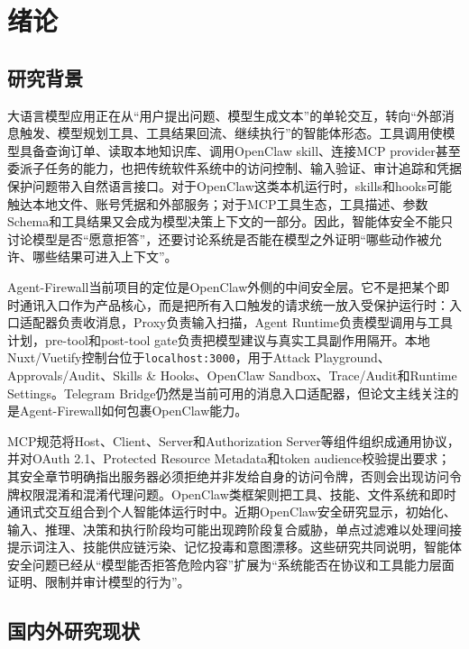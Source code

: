 \documentclass[UTF8,zihao=-4,scheme=chinese,fontset=none]{ctexart}
\newcommand{\code}[1]{{\ttfamily\small\nolinkurl{#1}}}
\begin{document}
\clearpage
{}
\setcounter{page}{1}

\section{绪论}

\subsection{研究背景}

大语言模型应用正在从“用户提出问题、模型生成文本”的单轮交互，转向“外部消息触发、模型规划工具、工具结果回流、继续执行”的智能体形态。工具调用使模型具备查询订单、读取本地知识库、调用OpenClaw skill、连接MCP provider甚至委派子任务的能力，也把传统软件系统中的访问控制、输入验证、审计追踪和凭据保护问题带入自然语言接口。对于OpenClaw这类本机运行时，skills和hooks可能触达本地文件、账号凭据和外部服务；对于MCP工具生态，工具描述、参数Schema和工具结果又会成为模型决策上下文的一部分。因此，智能体安全不能只讨论模型是否“愿意拒答”，还要讨论系统是否能在模型之外证明“哪些动作被允许、哪些结果可进入上下文”。

Agent-Firewall当前项目的定位是OpenClaw外侧的中间安全层。它不是把某个即时通讯入口作为产品核心，而是把所有入口触发的请求统一放入受保护运行时：入口适配器负责收消息，Proxy负责输入扫描，Agent Runtime负责模型调用与工具计划，pre-tool和post-tool gate负责把模型建议与真实工具副作用隔开。本地Nuxt/Vuetify控制台位于\code{localhost:3000}，用于Attack Playground、Approvals/Audit、Skills \& Hooks、OpenClaw Sandbox、Trace/Audit和Runtime Settings。Telegram Bridge仍然是当前可用的消息入口适配器，但论文主线关注的是Agent-Firewall如何包裹OpenClaw能力。

MCP规范将Host、Client、Server和Authorization Server等组件组织成通用协议，并对OAuth 2.1、Protected Resource Metadata和token audience校验提出要求；其安全章节明确指出服务器必须拒绝并非发给自身的访问令牌，否则会出现访问令牌权限混淆和混淆代理问题\cite{mcp_auth}。OpenClaw类框架则把工具、技能、文件系统和即时通讯式交互组合到个人智能体运行时中。近期OpenClaw安全研究显示，初始化、输入、推理、决策和执行阶段均可能出现跨阶段复合威胁，单点过滤难以处理间接提示词注入、技能供应链污染、记忆投毒和意图漂移\cite{deng2026taming}。这些研究共同说明，智能体安全问题已经从“模型能否拒答危险内容”扩展为“系统能否在协议和工具能力层面证明、限制并审计模型的行为”。

\subsection{国内外研究现状}
\end{document}
